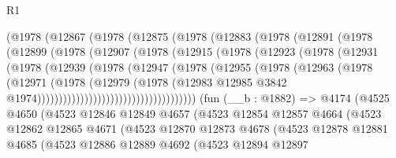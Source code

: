 \begin{lexlean}{R1}
\begin{coremodule}
              (@1978
                (@12867
                  (@1978
                    (@12875
                      (@1978
                        (@12883
                          (@1978
                            (@12891
                              (@1978
                                (@12899
                                  (@1978
                                    (@12907
                                      (@1978
                                        (@12915
                                          (@1978
                                            (@12923
                                              (@1978
                                                (@12931
                                                  (@1978
                                                    (@12939
                                                      (@1978
                                                        (@12947
                                                          (@1978
                                                            (@12955
                                                              (@1978
                                                                (@12963
                                                                  (@1978
                                                                    (@12971
                                                                      (@1978
                                                                        (@12979
                                                                          (@1978
                                                                            (@12983
                                                                              @12985
                                                                              @3842
                                                                              @1974)))))))))))))))))))))))))))))))))))))
    (fun (__b : @1882) =>
    @4174
      (@4525
        @4650
        (@4523
          @12846
          @12849
          @4657
          (@4523
            @12854
            @12857
            @4664
            (@4523
              @12862
              @12865
              @4671
              (@4523
                @12870
                @12873
                @4678
                (@4523
                  @12878
                  @12881
                  @4685
                  (@4523
                    @12886
                    @12889
                    @4692
                    (@4523
                      @12894
                      @12897

\end{coremodule}
\end{lexlean}
